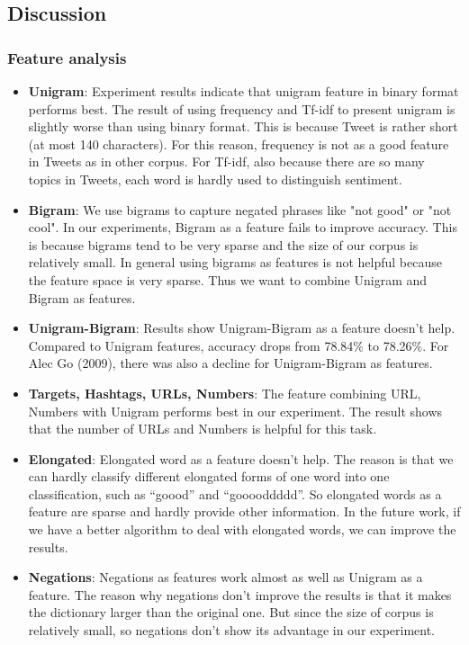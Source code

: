 \subsection{Discussion}
\subsubsection{Feature analysis}
\begin{itemize}
\item \textbf{Unigram}: Experiment results indicate that unigram feature in binary format performs best. 
The result of using frequency and Tf-idf to present unigram is slightly worse than using binary format. This is because Tweet is rather short (at most 140 characters). For this reason, 
 frequency is not as a good feature in Tweets as in other corpus. For Tf-idf, also because there are so many topics in Tweets, each word is hardly used to distinguish sentiment.

\item \textbf{Bigram}: We use bigrams to capture negated phrases like "not good" or "not cool". In our experiments, Bigram as a feature fails to improve accuracy. This is because bigrams tend to be very sparse and the size of our corpus is relatively small. In general using bigrams as features is not helpful because the feature space is very sparse. Thus we want to combine Unigram and Bigram as features. 

\item \textbf{Unigram-Bigram}: Results show Unigram-Bigram as a feature doesn’t help. Compared to Unigram features, accuracy drops from 78.84\% to 78.26\%. For Alec Go (2009), there was also a decline for Unigram-Bigram as features. 

\item \textbf{Targets, Hashtags, URLs, Numbers}: The feature combining URL, Numbers with Unigram performs best in our experiment. The result shows that the number of URLs and Numbers is helpful for this task. 

\item \textbf{Elongated}:  Elongated word as a feature doesn’t help. The reason is that we can hardly classify different elongated forms of one word into one classification, such as “goood” and “gooooddddd”. So elongated words as a feature are sparse and hardly provide other information. In the future work, if we have a better algorithm to deal with elongated words, we can improve the results. 

\item \textbf{Negations}: Negations as features work almost as well as Unigram as a feature. The reason why negations don’t improve the results is that it makes the dictionary larger than the original one. But since the size of corpus is relatively small, so negations don’t show its advantage in our experiment. 

\end{itemize}

